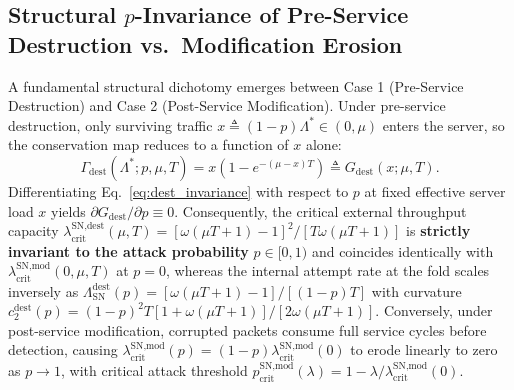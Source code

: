 \documentclass[12pt,onecolumn]{article}
\begin{document}
\subsection{Structural \texorpdfstring{$p$}{p}-Invariance of Pre-Service Destruction vs.\ Modification Erosion}
A fundamental structural dichotomy emerges between Case 1 (Pre-Service Destruction) and Case 2 (Post-Service Modification). Under pre-service destruction, only surviving traffic $x \triangleq (1 - p)\Lambda^* \in (0, \mu)$ enters the server, so the conservation map reduces to a function of $x$ alone:
\begin{equation}
\Gamma_{\text{dest}}(\Lambda^*; p, \mu, T) = x\!\left(1 - e^{-(\mu - x)T}\right) \triangleq G_{\text{dest}}(x; \mu, T).
\label{eq:dest_invariance}
\end{equation}
Differentiating Eq.~\eqref{eq:dest_invariance} with respect to $p$ at fixed effective server load $x$ yields $\partial G_{\text{dest}}/\partial p \equiv 0$. Consequently, the critical external throughput capacity $\lambda_{\text{crit}}^{\text{SN,dest}}(\mu, T) = [\omega(\mu T + 1) - 1]^2 / [T\omega(\mu T + 1)]$ is \textbf{strictly invariant to the attack probability} $p \in [0, 1)$ and coincides identically with $\lambda_{\text{crit}}^{\text{SN,mod}}(0, \mu, T)$ at $p = 0$, whereas the internal attempt rate at the fold scales inversely as $\Lambda_{\text{SN}}^{\text{dest}}(p) = [\omega(\mu T + 1) - 1]/[(1 - p)T]$ with curvature $c_2^{\text{dest}}(p) = (1-p)^2 T[1 + \omega(\mu T + 1)]/[2\omega(\mu T + 1)]$. Conversely, under post-service modification, corrupted packets consume full service cycles before detection, causing $\lambda_{\text{crit}}^{\text{SN,mod}}(p) = (1 - p)\lambda_{\text{crit}}^{\text{SN,mod}}(0)$ to erode linearly to zero as $p \to 1$, with critical attack threshold $p_{\text{crit}}^{\text{SN,mod}}(\lambda) = 1 - \lambda / \lambda_{\text{crit}}^{\text{SN,mod}}(0)$.
\end{document}

